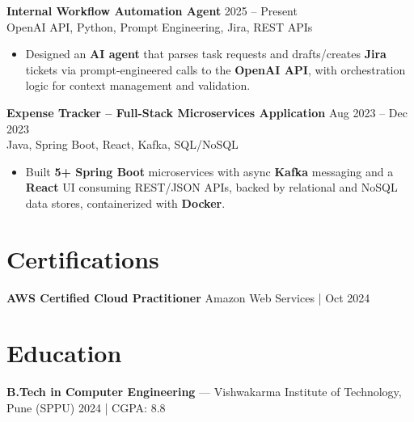 \documentclass[10pt,letterpaper]{article}
\newcommand{\resumeSubheading}[4]{%
  \textbf{#1} \hfill #2 \\
  #3 \hfill #4 \\
}
\begin{document}
\resumeSubheading{Internal Workflow Automation Agent}{2025 -- Present}{}{OpenAI API, Python, Prompt Engineering, Jira, REST APIs}
\begin{itemize}
    \item Designed an \textbf{AI agent} that parses task requests and drafts/creates \textbf{Jira} tickets via prompt-engineered calls to the \textbf{OpenAI API}, with orchestration logic for context management and validation.
\end{itemize}

\resumeSubheading{Expense Tracker -- Full-Stack Microservices Application}{Aug 2023 -- Dec 2023}{}{Java, Spring Boot, React, Kafka, SQL/NoSQL}
\begin{itemize}
    \item Built \textbf{5+ Spring Boot} microservices with async \textbf{Kafka} messaging and a \textbf{React} UI consuming REST/JSON APIs, backed by relational and NoSQL data stores, containerized with \textbf{Docker}.
\end{itemize}

\section*{Certifications}
\textbf{AWS Certified Cloud Practitioner} \hfill Amazon Web Services \;|\; Oct 2024

\section*{Education}
\textbf{B.Tech in Computer Engineering} --- Vishwakarma Institute of Technology, Pune (SPPU) \hfill 2024 \;|\; CGPA: 8.8
\end{document}

